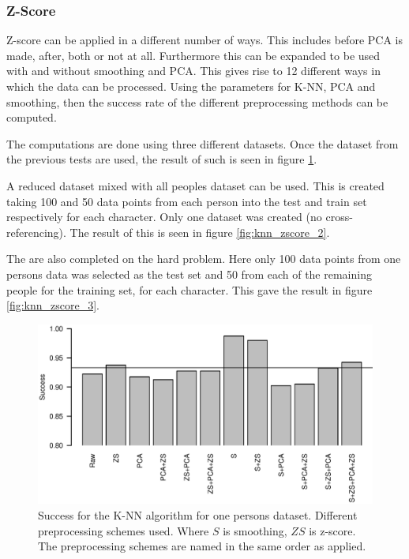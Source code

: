 \subsubsection{Z-Score}
Z-score can be applied in a different number of ways.
This includes before PCA is made, after, both or not at all.
Furthermore this can be expanded to be used with and without smoothing and PCA.
This gives rise to 12 different ways in which the data can be processed.
Using the parameters for K-NN, PCA and smoothing, then the success rate of the different preprocessing methods can be computed.

The computations are done using three different datasets.
Once the dataset from the previous tests are used, the result of such is seen in figure \ref{fig:knn_zscore_1}.

A reduced dataset mixed with all peoples dataset can be used.
This is created taking 100 and 50 data points from each person into the test and train set respectively for each character.
Only one dataset was created (no cross-referencing).
The result of this is seen in figure \ref{fig:knn_zscore_2}.

The are also completed on the hard problem.
Here only 100 data points from one persons data was selected as the test set and 50 from each of the remaining people for the training set, for each character.
This gave the result in figure \ref{fig:knn_zscore_3}.


\begin{figure}[H]
\includegraphics[width = 0.9 \textwidth]{graphics/knn_zscore_1}
\caption{Success for the K-NN algorithm for one persons dataset. Different preprocessing schemes used.
Where $S$ is smoothing, $ZS$ is z-score.
The preprocessing schemes are named in the same order as applied.}
\label{fig:knn_zscore_1}
\end{figure}

